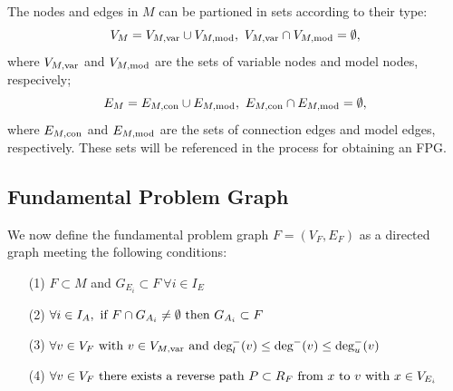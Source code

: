 The nodes and edges in $M$ can be partioned in sets according to their type:
\begin{equation}
V_M = V_{M,\txt{var}} \cup V_{M,\txt{mod}}, \ V_{M,\txt{var}} \cap V_{M,\txt{mod}} = \emptyset,
\end{equation}
where $V_{M,\textrm{var}}$ and $V_{M,\textrm{mod}}$ are the sets of variable nodes and model nodes, respecively;
\begin{equation}
E_M = E_{M,\textrm{con}} \cup E_{M,\textrm{mod}}, \ E_{M,\textrm{con}} \cap E_{M,\textrm{mod}} = \emptyset,
\end{equation}
where $ E_{M,\textrm{con}}$ and $E_{M,\textrm{mod}}$ are the sets of connection edges and model edges, respectively. These sets will be referenced in the process for obtaining an FPG.

\subsection{Fundamental Problem Graph}
    \label{ss:FPG}
    We now define the fundamental problem graph $F=(V_F,E_F)$ as a directed graph meeting the following conditions:
    \begin{enumerate}
    \item[(1)] $F \subset M$ and $G_{E_i} \subset F  \ \forall i \in I_E$
    \item[(2)] $\displaystyle{\forall i \in I_A, \textrm{ if } F \cap G_{A_i} \neq \emptyset \textrm{ then } G_{A_i} \subset F}$
    \item[(3)] $\displaystyle{\forall v \in V_F \textrm{ with }v \in V_{M,\textrm{var}} \textrm{ and }  \textrm{deg}_l^-(v) \leq \textrm{deg}^-(v) \leq \textrm{deg}_u^-(v)}$
    \item[(4)] $\displaystyle{\forall v \in V_F \textrm{ there exists a reverse path } P \subset R_F \textrm{ from } x \textrm{ to } v \textrm{ with } x\in V_{E_i}}$
    \end{enumerate}
